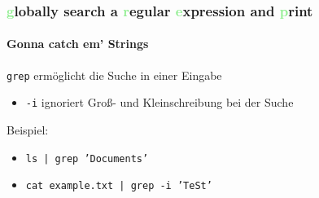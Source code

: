 \documentclass[12pt,utf8]{beamer}
\begin{document}
\begin{frame}
	\frametitle{\Large{\textcolor{lightGreen}{g}lobally search a \textcolor{lightGreen}{r}egular \textcolor{lightGreen}{e}xpression and \textcolor{lightGreen}{p}rint}}
	\framesubtitle{Gonna catch em' Strings}
	\texttt{grep} ermöglicht die Suche in einer Eingabe
	\begin{itemize}
		\item \texttt{-i} ignoriert Groß- und Kleinschreibung bei der Suche
	\end{itemize}
	Beispiel:
	\begin{itemize}
		\item \texttt{ls | grep 'Documents'}
		\item \texttt{cat example.txt | grep -i 'TeSt'}
	\end{itemize}
\end{frame}
\end{document}
